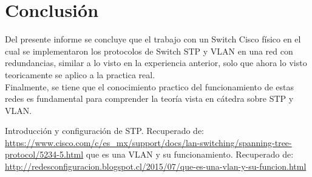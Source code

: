 \documentclass[spanish]{udpreport}
\begin{document}
\chapter{Conclusión}
Del presente informe se concluye que el trabajo con un Switch Cisco físico en el cual se implementaron los protocolos de Switch STP y VLAN en una red con redundancias, similar a lo visto en la experiencia anterior, solo que ahora lo visto teoricamente se aplico a la practica real. 
\\ Finalmente, se tiene que el conocimiento practico del funcionamiento de estas redes es fundamental para comprender la teoría vista en cátedra sobre STP y VLAN.
\begin{thebibliography}{0}
Introducción y configuración de STP. Recuperado de: \\ \url{https://www.cisco.com/c/es_mx/support/docs/lan-switching/spanning-tree-protocol/5234-5.html}
que es una VLAN y su funcionamiento. Recuperado de: \\
\url{http://redesconfiguracion.blogspot.cl/2015/07/que-es-una-vlan-y-su-funcion.html}
\end{thebibliography}
\listoffigures
\end{document}
